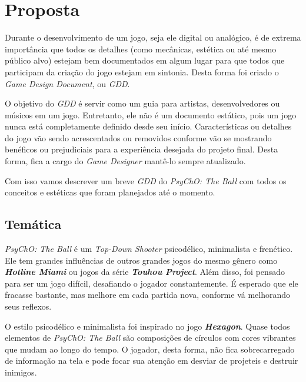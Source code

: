 
\chapter{Proposta}
\label{cap:proposta}

Durante o desenvolvimento de um jogo, seja ele digital ou analógico, é de extrema importância
que todos os detalhes (como mecânicas, estética ou até mesmo público alvo) estejam bem documentados
em algum lugar para que todos que participam da criação do jogo estejam em sintonia. Desta forma
foi criado o \textit{Game Design Document}, ou \textit{GDD}.

O objetivo do \textit{GDD} é servir como um guia para artistas, desenvolvedores ou músicos em um
jogo. Entretanto, ele não é um documento estático, pois um jogo nunca está completamente definido desde seu
início. Características ou detalhes do jogo vão sendo acrescentados ou removidos conforme vão se mostrando
benéficos ou prejudiciais para a experiência desejada do projeto final. Desta forma, fica a cargo do \textit{Game Designer} mantê-lo sempre atualizado.

Com isso vamos descrever um breve \textit{GDD} do \textit{PsyChO: The Ball} com todos os conceitos e
estéticas que foram planejados até o momento.

\section{Temática}
\label{sec:tematica}

\textit{PsyChO: The Ball} é um \textit{Top-Down Shooter} psicodélico, minimalista e frenético. Ele tem grandes influências de outros grandes jogos do mesmo gênero como \textbf{\textit{Hotline Miami}}\cite{hotline} ou jogos da série \textbf{\textit{Touhou Project}}\cite{touhou}. Além disso, foi pensado para ser um jogo difícil, desafiando o jogador constantemente. É esperado que ele fracasse bastante, mas melhore em cada partida nova, conforme vá melhorando seus reflexos.

O estilo psicodélico e minimalista foi inspirado no jogo \textbf{\textit{Hexagon}}\cite{hexagon}. Quase
todos elementos de \textit{PsyChO: The Ball} são composições de círculos com cores vibrantes que mudam ao longo do tempo. O jogador, desta forma, não fica sobrecarregado de informação na tela e pode focar sua atenção em desviar de projeteis e destruir inimigos.

